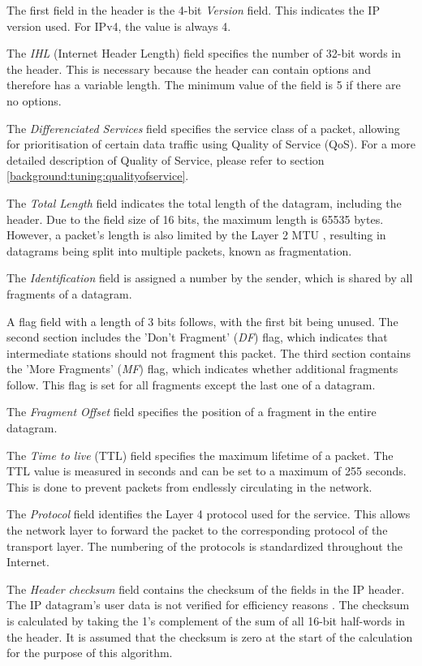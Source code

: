 The first field in the header is the 4-bit \textit{Version} field. This indicates the IP version used. For IPv4, the value is always 4.

The \textit{IHL} (Internet Header Length) field specifies the number of 32-bit words in the header. This is necessary because the header can contain options and therefore has a variable length. The minimum value of the field is 5 if there are no options.

The \textit{Differenciated Services} field specifies the service class of a packet, allowing for prioritisation of certain data traffic using Quality of Service (QoS). For a more detailed description of Quality of Service, please refer to section \ref{background:tuning:qualityofservice}.

The \textit{Total Length} field indicates the total length of the datagram, including the header. Due to the field size of 16 bits, the maximum length is 65535 bytes. However, a packet's length is also limited by the Layer 2 MTU \cite{Weigel2021}, resulting in datagrams being split into multiple packets, known as fragmentation. 

The \textit{Identification} field is assigned a number by the sender, which is shared by all fragments of a datagram.

A flag field with a length of 3 bits follows, with the first bit being unused. The second section includes the 'Don't Fragment' (\textit{DF}) flag, which indicates that intermediate stations should not fragment this packet. The third section contains the 'More Fragments' (\textit{MF}) flag, which indicates whether additional fragments follow. This flag is set for all fragments except the last one of a datagram.

The \textit{Fragment Offset} field specifies the position of a fragment in the entire datagram.

The \textit{Time to live} (TTL) field specifies the maximum lifetime of a packet. The TTL value is measured in seconds and can be set to a maximum of 255 seconds. This is done to prevent packets from endlessly circulating in the network.

The \textit{Protocol} field identifies the Layer 4 protocol used for the service. This allows the network layer to forward the packet to the corresponding protocol of the transport layer. The numbering of the protocols is standardized throughout the Internet.

The \textit{Header checksum} field contains the checksum of the fields in the IP header. The IP datagram's user data is not verified for efficiency reasons \cite{Holtkamp2024Internet}. The checksum is calculated by taking the 1's complement of the sum of all 16-bit half-words in the header. It is assumed that the checksum is zero at the start of the calculation for the purpose of this algorithm.

